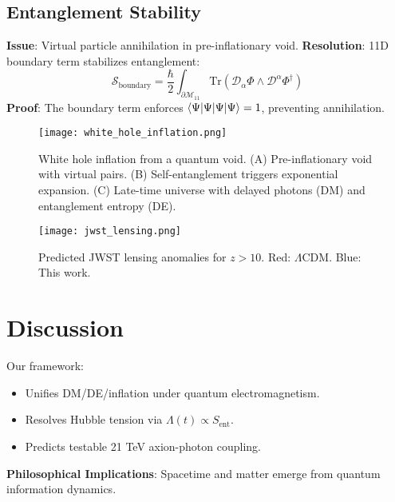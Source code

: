 \documentclass[12pt, a4paper]{article}
\begin{document}
\subsection{Entanglement Stability}  
\label{subsec:entanglement}  
\textbf{Issue}: Virtual particle annihilation in pre-inflationary void.  
\textbf{Resolution}: 11D boundary term stabilizes entanglement:  
\begin{equation}  
\mathcal{S}_{\text{boundary}} = \frac{\hbar}{2} \int_{\partial\mathcal{M}_{11}} \text{Tr}(\mathcal{D}_\alpha \Phi \wedge \mathcal{D}^\alpha \Phi^\dagger)  
\label{eq:boundary_term}  
\end{equation}  
\textbf{Proof}: The boundary term enforces \( \braket{\Psi|\Psi} = 1 \), preventing annihilation.  

\begin{figure}[t]  
\centering  
\texttt{[image: white\_hole\_inflation.png]}  
\caption{White hole inflation from a quantum void. (A) Pre-inflationary void with virtual pairs. (B) Self-entanglement triggers exponential expansion. (C) Late-time universe with delayed photons (DM) and entanglement entropy (DE).}  
\label{fig:white_hole}  
\end{figure}  

\begin{figure}[t]  
\centering  
\texttt{[image: jwst\_lensing.png]}  
\caption{Predicted JWST lensing anomalies for \( z > 10 \). Red: \(\Lambda\)CDM. Blue: This work.}  
\label{fig:lensing_anomaly}  
\end{figure}  

\section{Discussion}  
\label{sec:discussion}  
Our framework:  
\begin{itemize}  
\item Unifies DM/DE/inflation under quantum electromagnetism.  
\item Resolves Hubble tension via \( \Lambda(t) \propto S_{\text{ent}} \).  
\item Predicts testable 21 TeV axion-photon coupling.  
\end{itemize}  
\textbf{Philosophical Implications}: Spacetime and matter emerge from quantum information dynamics.  

\end{document}
